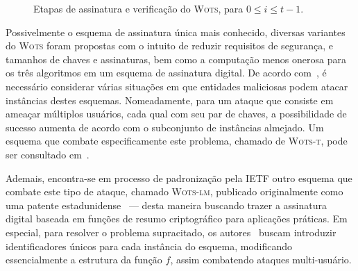 \documentclass[12pt,notitlepage]{report}
\newcommand{\wots}{\textsc{Wots}}
\newcommand{\wotslm}{\textsc{Wots-lm}}
\newcommand{\wotst}{\textsc{Wots-t}}
\begin{document}
\begin{figure}[ht]
  \centering
  \caption{Etapas de assinatura e verificação do \wots{},
    para $0 \leq i \leq t - 1$.}
  \label{fig:5}
\end{figure}

Possivelmente o esquema de assinatura única mais conhecido, diversas variantes do
\wots{} foram propostas com o intuito de reduzir requisitos de segurança,
e tamanhos de chaves e assinaturas, bem como a computação menos onerosa para os
três algoritmos em um esquema de assinatura digital. De acordo
com~\cite{LafrancePhilip2017}, é necessário considerar várias situações em que
entidades maliciosas podem atacar instâncias destes esquemas. Nomeadamente, para
um ataque que consiste em ameaçar múltiplos usuários, cada qual com seu par de
chaves, a possibilidade de sucesso aumenta de acordo com o subconjunto de
instâncias almejado. Um esquema que combate especificamente este problema,
chamado de \wotst{}, pode ser consultado em~\cite{Hulsing:2016:MMA:3081852.3081871}.

Ademais, encontra-se em processo de padronização pela IETF outro esquema que combate este tipo de ataque, chamado \wotslm{}, publicado
originalmente como uma patente estadunidense~\cite{lm-patent} --- desta maneira
buscando trazer a assinatura digital baseada em funções de resumo criptográfico
para aplicações práticas. Em especial, para resolver o problema supracitado, os
autores~\cite{mcgrew-hash-sigs-11} buscam introduzir identificadores únicos para cada instância do
esquema, modificando essencialmente a estrutura da função $f$, assim combatendo
ataques multi-usuário.
\end{document}
